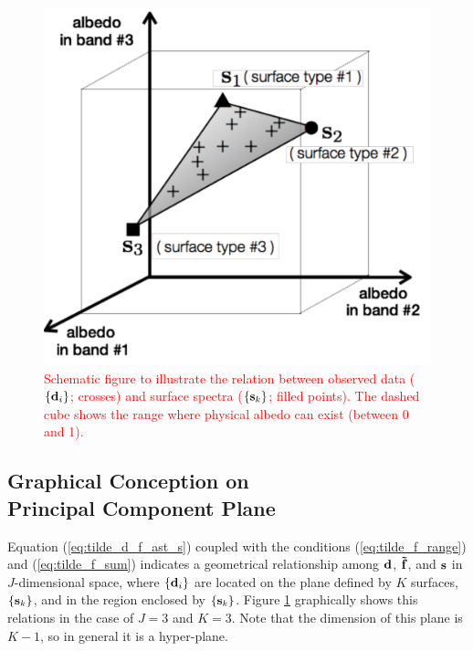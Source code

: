 \documentclass[iop,numberedappendix,apj]{emulateapj}
\def\fast{\tilde f}
\def\edit#1{\textcolor{red}{#1}}
\def\memoYF#1{\color{red}[YF: {\bf #1}]\color{black}}
\begin{document}
\begin{figure}[b!]
    \begin{center}
\includegraphics[width=0.8\hsize]{schematics_ver3.pdf}
    \end{center}
    \caption{\edit{Schematic figure to illustrate the relation between observed data ($\{{\bf d}_i\} $; crosses) and surface spectra ($\{{\bf s}_k\} $; filled points). The dashed cube shows the range where physical albedo can exist (between 0 and 1). }}
\label{fig:schematic}
\end{figure}


\subsection{Graphical Conception on \\Principal Component Plane}
\label{ss:PCplane}


Equation (\ref{eq:tilde_d_f_ast_s}) coupled with the conditions (\ref{eq:tilde_f_range}) and (\ref{eq:tilde_f_sum}) indicates a geometrical relationship among ${\bf d}$, ${\bf \fast }$, and ${\bf s}$ in 
$J$-dimensional space, where $\{{\bf d}_i\}$ are located on the plane defined by $K$ surfaces, $\{{\bf s}_k\} $, and in the region enclosed by $\{{\bf s}_k\} $. 
Figure \ref{fig:schematic} graphically shows this relations in the case of $J=3$ and $K=3$. 
Note that the dimension of this plane is $K-1$, so in general it is a hyper-plane.  
\end{document}
